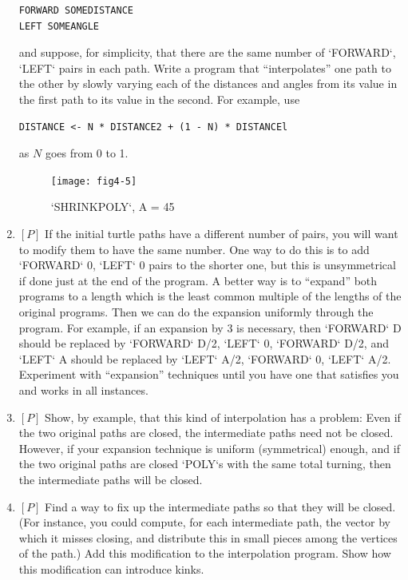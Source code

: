 \documentclass{book}
\begin{document}
\begin{enumerate}
\begin{verbatim}
FORWARD SOMEDISTANCE
LEFT SOMEANGLE
\end{verbatim}
and suppose, for simplicity, that there are the same number of \textsc{`FORWARD`},
\textsc{`LEFT`} pairs in each path. Write a program that ``interpolates'' one path
to the other by slowly varying each of the distances and angles from its
value in the first path to its value in the second. For example, use

\begin{verbatim}
DISTANCE <- N * DISTANCE2 + (1 - N) * DISTANCEl
\end{verbatim}
as $N$ goes from 0 to 1.

\begin{figure}
\begin{center}
\texttt{[image: fig4-5]}
\caption{\textsc{`SHRINKPOLY`}, A = 45}
\end{center}
\end{figure}


\item $[P]$ If the initial turtle paths have a different number of pairs, you
will want to modify them to have the same number. One way to do
this is to add \textsc{`FORWARD`} 0, \textsc{`LEFT`} 0 pairs to the shorter one, but this is
unsymmetrical if done just at the end of the program. A better way is to
``expand'' both programs to a length which is the least common multiple
of the lengths of the original programs. Then we can do the expansion
uniformly through the program. For example, if an expansion by 3 is
necessary, then \textsc{`FORWARD`} D should be replaced by \textsc{`FORWARD`} D/2, \textsc{`LEFT`} 0,
\textsc{`FORWARD`} D/2, and \textsc{`LEFT`} A should be replaced by \textsc{`LEFT`} A/2, \textsc{`FORWARD`} 0,
\textsc{`LEFT`} A/2. Experiment with ``expansion'' techniques until you have one
that satisfies you and works in all instances.

\item $[P]$ Show, by example, that this kind of interpolation has a problem:
Even if the two original paths are closed, the intermediate paths need not
be closed. However, if your expansion technique is uniform (symmetrical)
enough, and if the two original paths are closed \textsc{`POLY`}s with the same
total turning, then the intermediate paths will be closed.

\item $[P]$ Find a way to fix up the intermediate paths so that they will
be closed. (For instance, you could compute, for each intermediate
path, the vector by which it misses closing, and distribute this in small
pieces among the vertices of the path.) Add this modification to the
interpolation program. Show how this modification can introduce kinks.


\end{enumerate}
\end{document}
